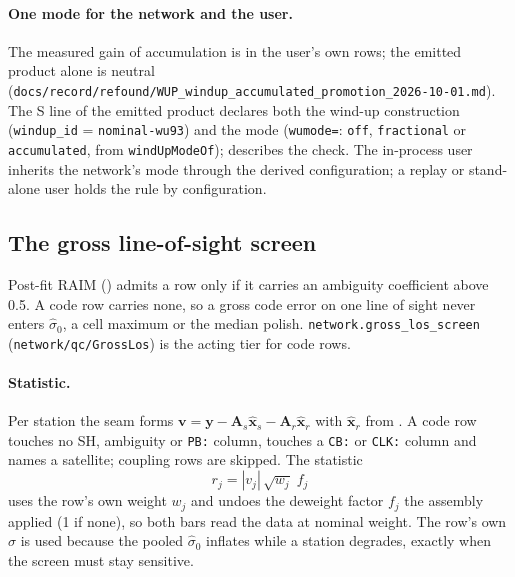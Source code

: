 \documentclass[main.tex]{subfiles}
\begin{document}
\paragraph{One mode for the network and the user.}
The measured gain of accumulation is in the user's own rows; the emitted
product alone is neutral
(\texttt{docs/record/refound/WUP\_windup\_accumulated\_promotion\_2026-10-01.md}).
The S line of the emitted product declares both the wind-up construction
(\texttt{windup\_id} = \texttt{nominal-wu93}) and the mode
(\texttt{wumode=}: \texttt{off}, \texttt{fractional} or
\texttt{accumulated}, from \texttt{windUpModeOf}); 
describes the check. The in-process user inherits the network's mode
through the derived configuration; a replay or stand-alone user holds the
rule by configuration.

\subsection{The gross line-of-sight screen}\label{sec:net-wire-gross}

Post-fit RAIM () admits a row only if it carries an ambiguity coefficient above
0.5. A code row carries none, so a gross code error on one line of sight
never enters $\hat\sigma_0$, a cell maximum or the median polish.
\texttt{network.gross\_los\_screen} (\texttt{network/qc/GrossLos}) is
the acting tier for code rows.

\paragraph{Statistic.}
Per station the seam forms $\bm{v} = \bm{y} - \bm{A}_s\hat{\bm{x}}_s -
\bm{A}_r\hat{\bm{x}}_r$ with $\hat{\bm{x}}_r$ from
. A code row touches no SH, ambiguity or \texttt{PB:} column,
touches a \texttt{CB:} or \texttt{CLK:} column and names a satellite;
coupling rows are skipped. The statistic
\begin{equation}
r_j = |v_j|\,\sqrt{w_j}\; f_j
\label{eq:wire-gl-stat}
\end{equation}
uses the row's own weight $w_j$ and undoes the deweight factor $f_j$
the assembly applied (1 if none), so both bars read the data at nominal
weight. The row's own $\sigma$ is used because the pooled $\hat\sigma_0$
inflates while a station degrades, exactly when the screen must stay
sensitive.
\end{document}
